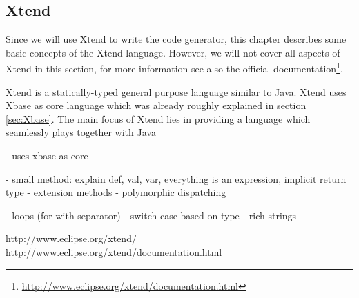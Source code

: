\subsection{Xtend}

Since we will use Xtend to write the code generator, this chapter describes some
basic concepts of the Xtend language. However, we will not cover all aspects of
Xtend in this section, for more information see also the official documentation\footnote{\url{http://www.eclipse.org/xtend/documentation.html}}.

Xtend is a statically-typed general purpose language similar to Java. Xtend uses
Xbase as core language which was already roughly explained in section \ref{sec:Xbase}.
The main focus of Xtend lies in providing a language which seamlessly plays together with 
Java 

- uses xbase as core

- small method: explain def, val, var, everything is an expression, implicit return type
- extension methods
- polymorphic dispatching

- loops (for with separator)
- switch case based on type
- rich strings

http://www.eclipse.org/xtend/
http://www.eclipse.org/xtend/documentation.html